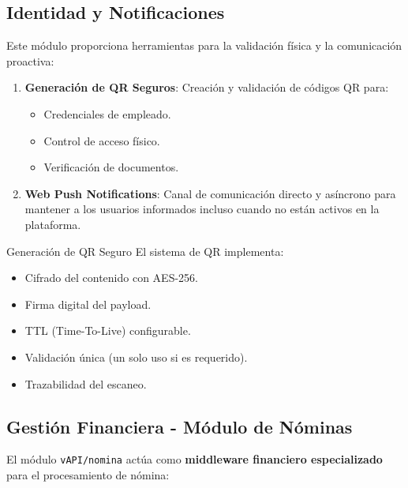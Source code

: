 \subsection{Identidad y Notificaciones}

Este módulo proporciona herramientas para la validación física y la comunicación proactiva:

\begin{enumerate}
\item \textbf{Generación de QR Seguros}: Creación y validación de códigos QR para:
   \begin{itemize}
   \item Credenciales de empleado.
   \item Control de acceso físico.
   \item Verificación de documentos.
   \end{itemize}
\item \textbf{Web Push Notifications}: Canal de comunicación directo y asíncrono para mantener a los usuarios informados incluso cuando no están activos en la plataforma.
\end{enumerate}

\begin{caja}{Generación de QR Seguro}
El sistema de QR implementa:
\begin{itemize}
\item Cifrado del contenido con AES-256.
\item Firma digital del payload.
\item TTL (Time-To-Live) configurable.
\item Validación única (un solo uso si es requerido).
\item Trazabilidad del escaneo.
\end{itemize}
\end{caja}

\subsection{Gestión Financiera - Módulo de Nóminas}

El módulo \texttt{vAPI/nomina} actúa como \textbf{middleware financiero especializado} para el procesamiento de nómina:

